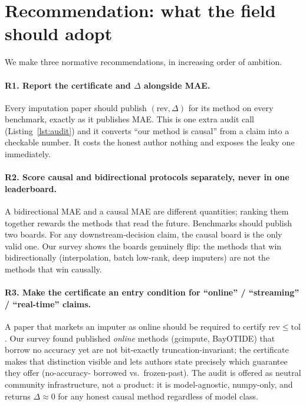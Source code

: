 \documentclass[10pt,twocolumn]{article}
\begin{document}
\section{Recommendation: what the field should adopt}\label{sec:rec}
We make three normative recommendations, in increasing order of ambition.

\paragraph{R1. Report the certificate and $\Delta$ alongside MAE.} Every
imputation paper should publish $(\mathrm{rev},\Delta)$ for its method on every
benchmark, exactly as it publishes MAE. This is one extra audit call
(Listing~\ref{lst:audit}) and it converts ``our method is causal'' from a claim
into a checkable number. It costs the honest author nothing and exposes the
leaky one immediately.

\paragraph{R2. Score causal and bidirectional protocols separately, never in one
leaderboard.} A bidirectional MAE and a causal MAE are different quantities;
ranking them together rewards the methods that read the future. Benchmarks should
publish two boards. For any downstream-decision claim, the causal board is the
only valid one. Our survey shows the boards genuinely flip: the methods that win
bidirectionally (interpolation, batch low-rank, deep imputers) are not the
methods that win causally.

\paragraph{R3. Make the certificate an entry condition for ``online'' /
``streaming'' / ``real-time'' claims.} A paper that markets an imputer as online
should be required to certify $\mathrm{rev}\le\mathrm{tol}$. Our survey found
published \emph{online} methods (gcimpute, BayOTIDE) that borrow no accuracy yet
are not bit-exactly truncation-invariant; the certificate makes that distinction
visible and lets authors state precisely which guarantee they offer (no-accuracy-
borrowed vs.\ frozen-past). The audit is offered as neutral community
infrastructure, not a product: it is model-agnostic, numpy-only, and returns
$\Delta\approx0$ for any honest causal method regardless of model class.
\end{document}
